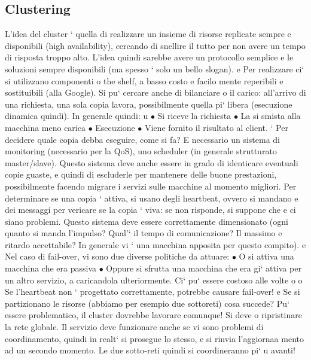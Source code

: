 \documentclass[a4paper,12pt]{article}
\begin{document}
\subsection{Clustering}
L'idea del cluster ` quella di realizzare un insieme di risorse replicate sempre
e
disponibili (high availability), cercando di snellire il tutto per non avere un tempo di risposta troppo alto. L'idea
quindi sarebbe avere un protocollo semplice
e le soluzioni sempre disponibili (ma spesso ` solo un bello slogan).
e
Per realizzare ci` si utilizzano componenti o the shelf, a basso costo e facilo
mente reperibili e sostituibili (alla Google). Si pu` cercare anche di bilanciare
o
il carico: all'arrivo di una richiesta, una sola copia lavora, possibilmente quella
pi` libera (esecuzione dinamica quindi). In generale quindi:
u
$\bullet$ Si riceve la richiesta
$\bullet$ La si smista alla macchina meno carica
$\bullet$ Esecuzione
$\bullet$ Viene fornito il risultato al client.
`
Per decidere quale copia debba eseguire, come si fa? E necessario un sistema
di monitoring (necessario per la QoS), uno scheduler (in generale strutturato
master/slave). Questo sistema deve anche essere in grado di identicare eventuali copie guaste, e quindi di escluderle
per mantenere delle buone prestazioni,
possibilmente facendo migrare i servizi sulle macchine al momento migliori. Per
determinare se una copia ` attiva, si usano degli heartbeat, ovvero si mandano
e
dei messaggi per vericare se la copia ` viva: se non risponde, si suppone che
e
ci siano problemi. Questo sistema deve essere correttamente dimensionato (ogni quanto si manda l'impulso? Qual'` il
tempo di comunicazione? Il massimo
e
ritardo accettabile? In generale vi ` una macchina apposita per questo compito).
e
Nel caso di fail-over, vi sono due diverse politiche da attuare:
$\bullet$ O si attiva una macchina che era passiva
$\bullet$ Oppure si sfrutta una macchina che era gi` attiva per un altro servizio,
a
caricandola ulteriormente. Ci` pu` essere costoso alle volte
o o
Se l'heartbeat non ` progettato correttamente, potrebbe causare fail-over!
e
Se si partizionano le risorse (abbiamo per esempio due sottoreti) cosa succede? Pu` essere problematico, il cluster
dovrebbe lavorare comunque! Si deve
o
ripristinare la rete globale. Il servizio deve funzionare anche se vi sono problemi
di coordinamento, quindi in realt` si prosegue lo stesso, e si rinvia l'aggiornaa
mento ad un secondo momento. Le due sotto-reti quindi si coordineranno pi`
u
avanti!
\end{document}
